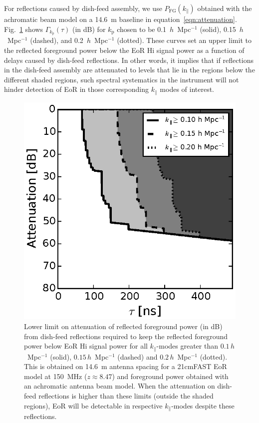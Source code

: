 \documentclass[preprint2,iop,numberedappendix,twocolappendix,appendixfloats]{emulateapj}
\begin{document}
For reflections caused by dish-feed assembly, we use $P_\textrm{FG}(k_\parallel)$ obtained with the achromatic beam model on a 14.6~m baseline in equation~\ref{eqn:attenuation}. Fig.~\ref{fig:fg-reflections-achrmbeam} shows $\Gamma_{k_\textrm{p}}(\tau)$ (in dB) for $k_\textrm{p}$ chosen to be 0.1~$h$~Mpc$^{-1}$ (solid), 0.15~$h$~Mpc$^{-1}$ (dashed), and 0.2~$h$~Mpc$^{-1}$ (dotted). These curves set an upper limit to the reflected foreground power below the EoR H{\sc i} signal power as a function of delays caused by dish-feed reflections. In other words, it implies that if reflections in the dish-feed assembly are attenuated to levels that lie in the regions below the different shaded regions, such spectral systematics in the instrument will not hinder detection of EoR in those corresponding $k_\parallel$ modes of interest. 

\begin{figure}[htb]
\centering
\includegraphics[width=\linewidth]{spec_on_achrmbeam_foreground_reflected_power_21cmfast_14.6m_150.0_MHz_subband_v2.eps}
\caption{Lower limit on attenuation of reflected foreground power (in dB) from dish-feed reflections required to keep the reflected foreground power below EoR H{\sc i} signal power for all $k_\parallel$-modes greater than $0.1\,h$~Mpc$^{-1}$ (solid), $0.15\,h$~Mpc$^{-1}$ (dashed) and $0.2\,h$~Mpc$^{-1}$ (dotted). This is obtained on 14.6~m antenna spacing for a 21cmFAST EoR model at 150~MHz ($z\approx 8.47$) and foreground power obtained with an achromatic antenna beam model. When the attenuation on dish-feed reflections is higher than these limits (outside the shaded regions), EoR will be detectable in respective $k_\parallel$-modes despite these reflections.}
\label{fig:fg-reflections-achrmbeam}
\end{figure}
\end{document}
